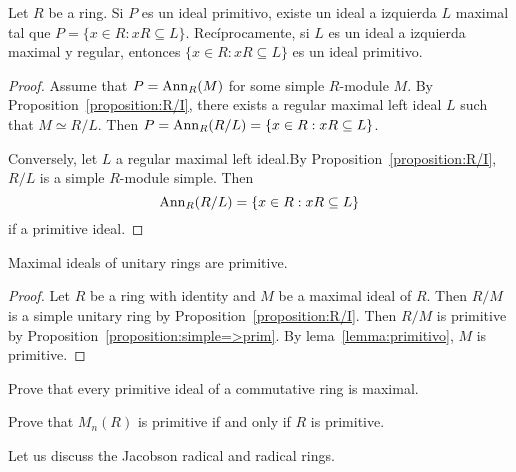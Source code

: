 \begin{lemma}
	\label{lemma:maxprim}
	Let $R$ be a ring. Si $P$ es un ideal primitivo, existe un ideal a
	izquierda $L$ maximal tal que $P=\{x\in R:xR\subseteq L\}$.
	Recíprocamente, si $L$ es un ideal a izquierda maximal y regular, entonces
	$\{x\in R:xR\subseteq L\}$ es un ideal primitivo.
\end{lemma}

\begin{proof}
	Assume that $P=\operatorname{Ann}_R(M)$ for some simple $R$-module $M$. By
	Proposition~\ref{proposition:R/I}, there exists a regular maximal 
	left ideal 
	$L$ such that $M\simeq R/L$. Then $P=\operatorname{Ann}_R(R/L)=\{x\in
	R:xR\subseteq L\}$. 

	Conversely, let $L$ a regular maximal left ideal.By
	Proposition~\ref{proposition:R/I}, $R/L$ is a simple $R$-module simple. Then
	\[
	\operatorname{Ann}_R(R/L)=\{x\in R:xR\subseteq L\}
	\]
	if a primitive ideal.
\end{proof}


\begin{proposition}
    Maximal ideals of unitary rings are primitive.  
\end{proposition}

\begin{proof}
	Let $R$ be a ring with identity and $M$ be a maximal ideal of $R$. Then 
	$R/M$ is a simple unitary ring by 
	Proposition~\ref{proposition:R/I}. Then $R/M$ is primitive by
	Proposition~\ref{proposition:simple=>prim}. By lema~\ref{lemma:primitivo}, 
	$M$ is primitive. 
\end{proof}

\begin{exercise}
	Prove that every primitive ideal of a commutative ring is maximal.
\end{exercise}

\begin{exercise}
    Prove that $M_n(R)$ is primitive if and only if $R$ is primitive.
\end{exercise}


Let us discuss the Jacobson radical and radical rings. 


